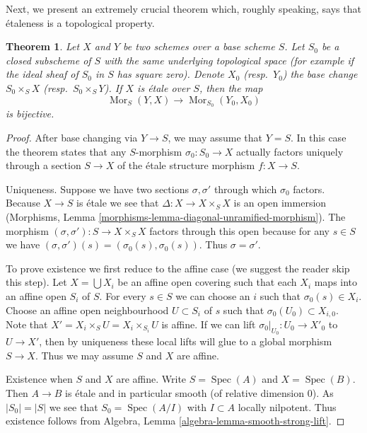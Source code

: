 \documentclass{stacks-project}
\theoremstyle{plain}
\newtheorem{theorem}[subsection]{Theorem}
\theoremstyle{definition}
\theoremstyle{remark}
\numberwithin{equation}{subsection}
\def\Spec{\mathop{\mathrm{Spec}}}
\def\Mor{\mathop{\mathrm{Mor}}\nolimits}
\begin{document}
\noindent
Next, we present an extremely crucial theorem which, roughly speaking, says
that \'etaleness is a topological property.

\begin{theorem}
\label{theorem-etale-topological}
Let $X$ and $Y$ be two schemes over a base scheme $S$. Let $S_0$ be a closed
subscheme of $S$ with the same underlying topological space
(for example if the ideal sheaf of $S_0$ in $S$ has square zero).
Denote $X_0$ (resp.\ $Y_0$) the base change $S_0 \times_S X$
(resp.\ $S_0 \times_S Y$).
If $X$ is \'etale over $S$, then the map
$$
\Mor_S(Y, X) \longrightarrow \Mor_{S_0}(Y_0, X_0)
$$
is bijective.
\end{theorem}

\begin{proof}
After base changing via $Y \to S$, we may assume that $Y = S$.
In this case the theorem states that any $S$-morphism $\sigma_0 : S_0 \to X$
actually factors uniquely through a section $S \to X$ of the
\'etale structure morphism $f : X \to S$.

\medskip\noindent
Uniqueness. Suppose we have two sections $\sigma, \sigma'$
through which $\sigma_0$ factors. Because $X \to S$ is \'etale
we see that $\Delta : X \to X \times_S X$ is an open immersion
(Morphisms, Lemma \ref{morphisms-lemma-diagonal-unramified-morphism}).
The morphism $(\sigma, \sigma') : S \to X \times_S X$ factors
through this open because for any $s \in S$ we have
$(\sigma, \sigma')(s) = (\sigma_0(s), \sigma_0(s))$. Thus
$\sigma = \sigma'$.

\medskip\noindent
To prove existence we first reduce to the affine case
(we suggest the reader skip this step).
Let $X = \bigcup X_i$ be an affine open covering such
that each $X_i$ maps into an affine open $S_i$ of $S$.
For every $s \in S$ we can choose an $i$ such that
$\sigma_0(s) \in X_i$.
Choose an affine open neighbourhood $U \subset S_i$ of $s$
such that $\sigma_0(U_0) \subset X_{i, 0}$. Note that
$X' = X_i \times_S U = X_i \times_{S_i} U$ is affine.
If we can lift $\sigma_0|_{U_0} : U_0 \to X'_0$ to
$U \to X'$, then by uniqueness these local lifts will glue
to a global morphism $S \to X$. Thus we may assume $S$ and
$X$ are affine.

\medskip\noindent
Existence when $S$ and $X$ are affine. Write $S = \Spec(A)$
and $X = \Spec(B)$. Then $A \to B$ is \'etale and in particular
smooth (of relative dimension $0$). As $|S_0| = |S|$ we see
that $S_0 = \Spec(A/I)$ with $I \subset A$ locally nilpotent.
Thus existence follows from
Algebra, Lemma \ref{algebra-lemma-smooth-strong-lift}.
\end{proof}
\end{document}
